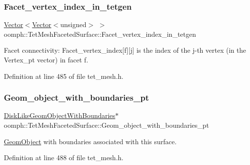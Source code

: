 \subsubsection{\texorpdfstring{Facet\+\_\+vertex\+\_\+index\+\_\+in\+\_\+tetgen}{Facet\_vertex\_index\_in\_tetgen}}
{\footnotesize\ttfamily \hyperlink{classoomph_1_1Vector}{Vector}$<$\hyperlink{classoomph_1_1Vector}{Vector}$<$unsigned$>$ $>$ oomph\+::\+Tet\+Mesh\+Faceted\+Surface\+::\+Facet\+\_\+vertex\+\_\+index\+\_\+in\+\_\+tetgen\hspace{0.3cm}{\ttfamily [protected]}}



Facet connectivity\+: Facet\+\_\+vertex\+\_\+index\mbox{[}f\mbox{]}\mbox{[}j\mbox{]} is the index of the j-\/th vertex (in the Vertex\+\_\+pt vector) in facet f. 



Definition at line 485 of file tet\+\_\+mesh.\+h.

\mbox{\label{classoomph_1_1TetMeshFacetedSurface_a6d5836261116c9fc17afa725fcd63bd1}} 
\subsubsection{\texorpdfstring{Geom\+\_\+object\+\_\+with\+\_\+boundaries\+\_\+pt}{Geom\_object\_with\_boundaries\_pt}}
{\footnotesize\ttfamily \hyperlink{classoomph_1_1DiskLikeGeomObjectWithBoundaries}{Disk\+Like\+Geom\+Object\+With\+Boundaries}$\ast$ oomph\+::\+Tet\+Mesh\+Faceted\+Surface\+::\+Geom\+\_\+object\+\_\+with\+\_\+boundaries\+\_\+pt\hspace{0.3cm}{\ttfamily [protected]}}



\hyperlink{classoomph_1_1GeomObject}{Geom\+Object} with boundaries associated with this surface. 



Definition at line 488 of file tet\+\_\+mesh.\+h.

\mbox{\label{classoomph_1_1TetMeshFacetedSurface_a5a755b2062fa4ed18f3bdd18236b0f72}} 
